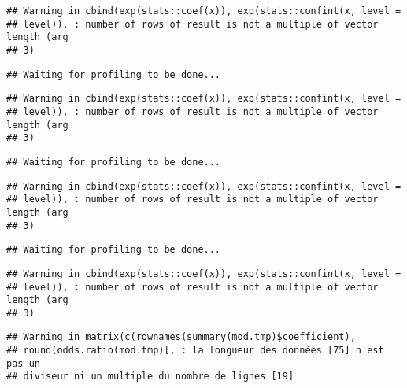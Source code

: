 \documentclass[]{article}
\newenvironment{Shaded}{\begin{snugshade}}{\end{snugshade}}
\newcommand{\KeywordTok}[1]{\textcolor[rgb]{0.13,0.29,0.53}{\textbf{#1}}}
\newcommand{\DataTypeTok}[1]{\textcolor[rgb]{0.13,0.29,0.53}{#1}}
\newcommand{\StringTok}[1]{\textcolor[rgb]{0.31,0.60,0.02}{#1}}
\newcommand{\OperatorTok}[1]{\textcolor[rgb]{0.81,0.36,0.00}{\textbf{#1}}}
\newcommand{\NormalTok}[1]{#1}
\begin{document}
\begin{verbatim}
## Warning in cbind(exp(stats::coef(x)), exp(stats::confint(x, level =
## level)), : number of rows of result is not a multiple of vector length (arg
## 3)
\end{verbatim}

\begin{verbatim}
## Waiting for profiling to be done...
\end{verbatim}

\begin{verbatim}
## Warning in cbind(exp(stats::coef(x)), exp(stats::confint(x, level =
## level)), : number of rows of result is not a multiple of vector length (arg
## 3)
\end{verbatim}

\begin{verbatim}
## Waiting for profiling to be done...
\end{verbatim}

\begin{verbatim}
## Warning in cbind(exp(stats::coef(x)), exp(stats::confint(x, level =
## level)), : number of rows of result is not a multiple of vector length (arg
## 3)
\end{verbatim}

\begin{verbatim}
## Waiting for profiling to be done...
\end{verbatim}

\begin{verbatim}
## Warning in cbind(exp(stats::coef(x)), exp(stats::confint(x, level =
## level)), : number of rows of result is not a multiple of vector length (arg
## 3)
\end{verbatim}

\begin{verbatim}
## Warning in matrix(c(rownames(summary(mod.tmp)$coefficient),
## round(odds.ratio(mod.tmp)[, : la longueur des données [75] n'est pas un
## diviseur ni un multiple du nombre de lignes [19]
\end{verbatim}

\begin{Shaded}
\end{Shaded}
\end{document}
